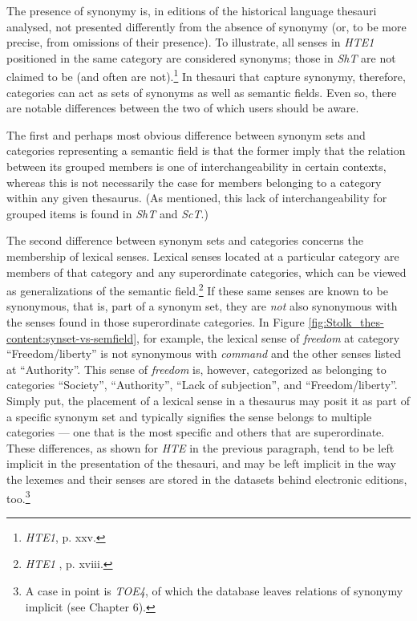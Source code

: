 The presence of synonymy is, in editions of the historical language thesauri analysed, not presented differently from the absence of synonymy (or, to be more precise, from omissions of their presence). To illustrate, all senses in \textit{HTE1} positioned in the same category are considered synonyms; those in \textit{ShT} are not claimed to be (and often are not).\footnote{\textit{HTE1}, p. xxv.} 
In thesauri that capture synonymy, therefore, categories can act as sets of synonyms as well as semantic fields. Even so, there are notable differences between the two of which users should be aware.

The first and perhaps most obvious difference between synonym sets and categories representing a semantic field is that the former imply that the relation between its grouped members is one of interchangeability in certain contexts, whereas this is not necessarily the case for members belonging to a category within any given thesaurus. (As mentioned, this lack of interchangeability for grouped items is found in \textit{ShT} and \textit{ScT}.) 

The second difference between synonym sets and categories concerns the membership of lexical senses. Lexical senses located at a particular category are members of that category and any superordinate categories, which can be viewed as generalizations of the semantic field.\footnote{\textit{HTE1}%
, p. xviii.} If these same senses are known to be synonymous, that is, part of a synonym set, they are \textit{not} also synonymous with the senses found in those superordinate categories. In Figure \ref{fig:Stolk_thes-content:synset-vs-semfield}, for example, the lexical sense of \textit{freedom} at category ``Freedom/liberty'' is not synonymous  with \textit{command} and the other senses listed at ``Authority''. This sense of \textit{freedom} is, however, categorized as belonging to categories ``Society'', ``Authority'', ``Lack of subjection'', and ``Freedom/liberty''. 
Simply put, the placement of a lexical sense in a thesaurus may posit it as part of a specific synonym set and typically signifies the sense belongs to multiple categories --- one that is the most specific and others that are superordinate. These differences, as shown for \textit{HTE} in the previous paragraph, tend to be left implicit in the presentation of the thesauri, and may be left implicit in the way the lexemes and their senses are stored in the datasets behind electronic editions, too.\footnote{A case in point is \textit{TOE4}, of which the database leaves relations of synonymy implicit (see Chapter 6).}

